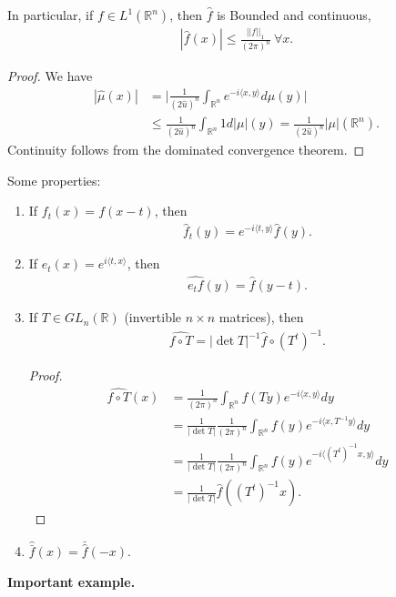 In particular, if \(f\in L^1(\mathbb{R}^n)\), then \(\hat{f}\) is Bounded and continuous,
\begin{align*}
    |\hat{f}(x)|\leq \frac{||f||_1}{(2\pi)^n} \ \forall x.
\end{align*}
\ifdetailed 
\begin{proof}
    We have
\begin{align*}
    |\hat{\mu}(x)| &= \Big\vert \frac{1}{(2\hat{u})^n}\int_{\mathbb{R}^n}e^{-i\langle x,y\rangle}d\mu(y)\Big\vert \\
    &\leq \frac{1}{(2\hat{u})^n} \int_{\mathbb{R}^n}1d|\mu|(y) = \frac{1}{(2\hat{u})^n}|\mu|(\mathbb{R}^n).
\end{align*}
Continuity follows from the dominated convergence theorem.
\end{proof}
\fi
Some properties:
\begin{enumerate}[label=(\roman*)]
    \item If \(f_t(x) = f(x-t)\), then 
    \begin{align*}
        \hat{f}_t(y) = e^{-i\langle t,y\rangle}\hat{f}(y).
    \end{align*}
    \item If \(e_t(x) = e^{i\langle t,x\rangle}\), then
    \begin{align*}
        \hat{e_t f}(y) = \hat{f}(y-t).
    \end{align*} 
    \item If \(T\in GL_n(\mathbb{R})\) (invertible \(n\times n\) matrices), then
    \begin{align*}
        \hat{f\circ T} = |\det T|^{-1}\hat{f}\circ(T^t)^{-1}.
    \end{align*}
    \ifdetailed
    \begin{proof}
        \begin{align*}
            \hat{f\circ T}(x) &= \frac{1}{(2\pi)^n} \int_{\mathbb{R}^n} f(Ty)e^{-i\langle x,y\rangle} dy \\
            &= \frac{1}{|\det T|}\frac{1}{(2\pi)^n} \int_{\mathbb{R}^n} f(y)e^{-i\langle x,T^{-1}y\rangle} dy\\
            &= \frac{1}{|\det T|}\frac{1}{(2\pi)^n} \int_{\mathbb{R}^n} f(y)e^{-i\langle (T^t)^{-1}x,y\rangle} dy \\
            &= \frac{1}{|\det T|}\hat{f}((T^t)^{-1}x).
        \end{align*}
    \end{proof}
    \fi 
    \item \(\hat{\bar{f}}(x) = \bar{\hat{f}}(-x)\).
\end{enumerate}
\textbf{Important example.} 

